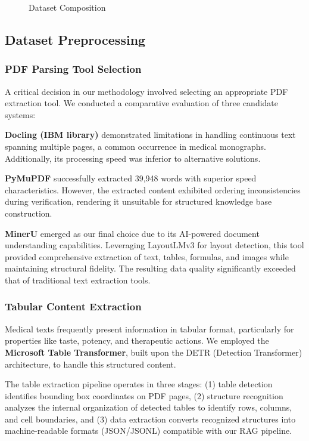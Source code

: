 \documentclass[conference]{IEEEtran}
\begin{document}
\begin{figure}[htbp]
\centerline{}
\caption{Dataset Composition}
\label{fig:dataset}
\end{figure}

\subsection{Dataset Preprocessing}

\subsubsection{PDF Parsing Tool Selection}
A critical decision in our methodology involved selecting an appropriate PDF extraction tool. We conducted a comparative evaluation of three candidate systems:

\textbf{Docling (IBM library)} demonstrated limitations in handling continuous text spanning multiple pages, a common occurrence in medical monographs. Additionally, its processing speed was inferior to alternative solutions.

\textbf{PyMuPDF} successfully extracted 39,948 words with superior speed characteristics. However, the extracted content exhibited ordering inconsistencies during verification, rendering it unsuitable for structured knowledge base construction.

\textbf{MinerU} emerged as our final choice due to its AI-powered document understanding capabilities. Leveraging LayoutLMv3 for layout detection, this tool provided comprehensive extraction of text, tables, formulas, and images while maintaining structural fidelity. The resulting data quality significantly exceeded that of traditional text extraction tools.

\subsubsection{Tabular Content Extraction}
Medical texts frequently present information in tabular format, particularly for properties like taste, potency, and therapeutic actions. We employed the \textbf{Microsoft Table Transformer}, built upon the DETR (Detection Transformer) architecture, to handle this structured content.

The table extraction pipeline operates in three stages: (1) table detection identifies bounding box coordinates on PDF pages, (2) structure recognition analyzes the internal organization of detected tables to identify rows, columns, and cell boundaries, and (3) data extraction converts recognized structures into machine-readable formats (JSON/JSONL) compatible with our RAG pipeline.
\end{document}
